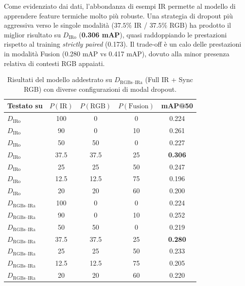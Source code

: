\documentclass[a4paper,12pt]{article}
\begin{document}
Come evidenziato dai dati, l'abbondanza di esempi IR permette al modello di apprendere feature termiche molto più robuste. Una strategia di dropout più aggressiva verso le singole modalità ($37.5\%$ IR / $37.5\%$ RGB) ha prodotto il miglior risultato su $D_{\text{IRo}}$ (\textbf{0.306 mAP}), quasi raddoppiando le prestazioni rispetto al training \textit{strictly paired} (0.173). 
Il trade-off è un calo delle prestazioni in modalità Fusion (0.280 mAP vs 0.417 mAP), dovuto alla minor presenza relativa di contesti RGB appaiati.

\begin{table}[H]
\centering
\caption{Risultati del modello addestrato su $D_{\text{RGBs--IRa}}$ (Full IR + Sync RGB) con diverse configurazioni di modal dropout.}
\label{tab:full_ir_synced_rgb}
\begin{tabular}{lcccc}
\toprule
Testato su & $P(\text{IR})$ & $P(\text{RGB})$ & $P(\text{Fusion})$ & mAP@50 \\
\midrule
$D_{\text{IRo}}$ & 100 & 0 & 0 & 0.224 \\
$D_{\text{IRo}}$ & 90 & 0 & 10 & 0.261 \\
$D_{\text{IRo}}$ & 50 & 50 & 0 & 0.227 \\
$D_{\text{IRo}}$ & 37.5 & 37.5 & 25 & \textbf{0.306} \\
$D_{\text{IRo}}$ & 25 & 25 & 50 & 0.247 \\
$D_{\text{IRo}}$ & 12.5 & 12.5 & 75 & 0.196 \\
$D_{\text{IRo}}$ & 20 & 20 & 60 & 0.200 \\
\midrule
$D_{\text{RGBs--IRa}}$ & 100 & 0 & 0 & 0.224 \\
$D_{\text{RGBs--IRa}}$ & 90 & 0 & 10 & 0.252 \\
$D_{\text{RGBs--IRa}}$ & 50 & 50 & 0 & 0.219 \\
$D_{\text{RGBs--IRa}}$ & 37.5 & 37.5 & 25 & \textbf{0.280} \\
$D_{\text{RGBs--IRa}}$ & 25 & 25 & 50 & 0.233 \\
$D_{\text{RGBs--IRa}}$ & 12.5 & 12.5 & 75 & 0.205 \\
$D_{\text{RGBs--IRa}}$ & 20 & 20 & 60 & 0.220 \\
\bottomrule
\end{tabular}
\end{table}

\newpage

\end{document}
